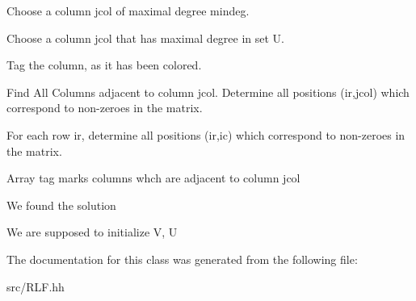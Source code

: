 Choose a column jcol of maximal degree mindeg.

Choose a column jcol that has maximal degree in set U.

Tag the column, as it has been colored.

Find All Columns adjacent to column jcol. Determine all positions (ir,jcol) which correspond to non-\/zeroes in the matrix.

For each row ir, determine all positions (ir,ic) which correspond to non-\/zeroes in the matrix.

Array tag marks columns whch are adjacent to column jcol

We found the solution

We are supposed to initialize V, U

The documentation for this class was generated from the following file:\begin{DoxyCompactItemize}
\item 
src/RLF.hh\end{DoxyCompactItemize}
